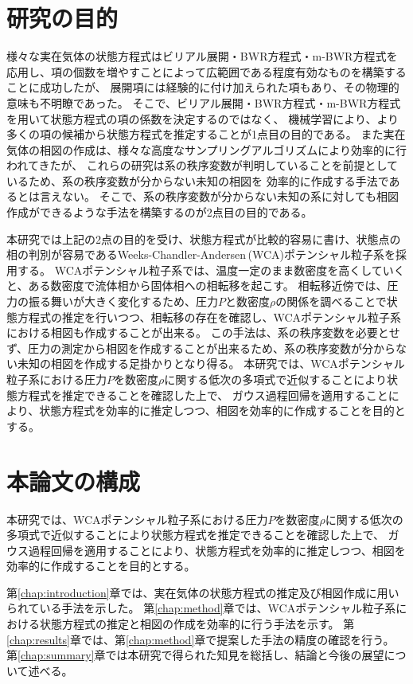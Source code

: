 \documentclass[titlepage]{jsreport}
\begin{document}
\section{研究の目的} \label{intro-purpose}
様々な実在気体の状態方程式はビリアル展開・BWR方程式・m-BWR方程式を応用し、項の個数を増やすことによって広範囲である程度有効なものを構築することに成功したが、
展開項には経験的に付け加えられた項もあり、その物理的意味も不明瞭であった。
そこで、ビリアル展開・BWR方程式・m-BWR方程式を用いて状態方程式の項の係数を決定するのではなく、
機械学習により、より多くの項の候補から状態方程式を推定することが1点目の目的である。
また実在気体の相図の作成は、様々な高度なサンプリングアルゴリズムにより効率的に行われてきたが、
これらの研究は系の秩序変数が判明していることを前提としているため、系の秩序変数が分からない未知の相図を
効率的に作成する手法であるとは言えない。
そこで、系の秩序変数が分からない未知の系に対しても相図作成ができるような手法を構築するのが2点目の目的である。

本研究では上記の2点の目的を受け、状態方程式が比較的容易に書け、状態点の相の判別が容易であるWeeks-Chandler-Andersen\,(WCA)ポテンシャル粒子系を採用する。
WCAポテンシャル粒子系では、温度一定のまま数密度を高くしていくと、ある数密度で流体相から固体相への相転移を起こす。
相転移近傍では、圧力の振る舞いが大きく変化するため、圧力$P$と数密度$\rho$の関係を調べることで状態方程式の推定を行いつつ、相転移の存在を確認し、WCAポテンシャル粒子系における相図も作成することが出来る。
この手法は、系の秩序変数を必要とせず、圧力の測定から相図を作成することが出来るため、系の秩序変数が分からない未知の相図を作成する足掛かりとなり得る。
本研究では、WCAポテンシャル粒子系における圧力$P$を数密度$\rho$に関する低次の多項式で近似することにより状態方程式を推定できることを確認した上で、
ガウス過程回帰を適用することにより、状態方程式を効率的に推定しつつ、相図を効率的に作成することを目的とする。


\section{本論文の構成} \label{intro-constitution}
本研究では、WCAポテンシャル粒子系における圧力$P$を数密度$\rho$に関する低次の多項式で近似することにより状態方程式を推定できることを確認した上で、
ガウス過程回帰を適用することにより、状態方程式を効率的に推定しつつ、相図を効率的に作成することを目的とする。

第\ref{chap:introduction}章では、実在気体の状態方程式の推定及び相図作成に用いられている手法を示した。
第\ref{chap:method}章では、WCAポテンシャル粒子系における状態方程式の推定と相図の作成を効率的に行う手法を示す。
第\ref{chap:results}章では、第\ref{chap:method}章で提案した手法の精度の確認を行う。
第\ref{chap:summary}章では本研究で得られた知見を総括し、結論と今後の展望について述べる。
\end{document}
